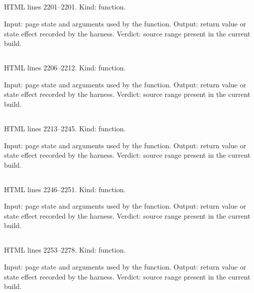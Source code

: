 \subsection*{\texttt{}}
\label{vf_45_crc32}
HTML lines 2201--2201. Kind: function.

Input: page state and arguments used by the function.
Output: return value or state effect recorded by the harness.
Verdict: source range present in the current build.

\subsection*{\texttt{}}
\label{vf_46_sourceSha256}
HTML lines 2206--2212. Kind: function.

Input: page state and arguments used by the function.
Output: return value or state effect recorded by the harness.
Verdict: source range present in the current build.

\subsection*{\texttt{}}
\label{vf_47_sha256Hex}
HTML lines 2213--2245. Kind: function.

Input: page state and arguments used by the function.
Output: return value or state effect recorded by the harness.
Verdict: source range present in the current build.

\subsection*{\texttt{}}
\label{vf_48_inflate}
HTML lines 2246--2251. Kind: function.

Input: page state and arguments used by the function.
Output: return value or state effect recorded by the harness.
Verdict: source range present in the current build.

\subsection*{\texttt{}}
\label{vf_49_readZip}
HTML lines 2253--2278. Kind: function.

Input: page state and arguments used by the function.
Output: return value or state effect recorded by the harness.
Verdict: source range present in the current build.

